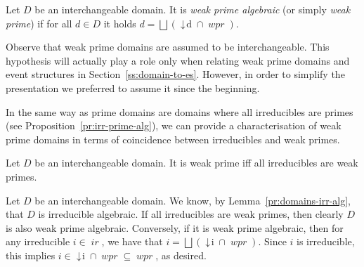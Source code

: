 \documentclass[conference]{IEEEtran}
\renewenvironment{proof}{\begin{IEEEproof}}{\end{IEEEproof}}
\newcommand{\wi}{{interchangeable}}
\newcommand{\compact}[1]{\ensuremath{\mathop{\mathsf{K}({#1})}}}
\newcommand{\principal}[1]{\ensuremath{\mathop{\downarrow\!{#1}}}}
\newcommand{\wpr}[1]{\ensuremath{\mathop{\mathit{wpr}({#1})}}}
\newcommand{\ir}[1]{\ensuremath{\mathop{\mathit{ir}({#1})}}}
\begin{document}
\begin{definition}
  \label{de:fusion-domain-new}
  Let $D$ be an {\wi} domain.  It is \emph{weak prime algebraic} (or simply
  \emph{weak prime}) if for all $d \in D$ it holds
  $d = \bigsqcup (\principal{d} \cap \wpr{D})$.
\end{definition}

Observe that weak prime domains are assumed to be interchangeable. This hypothesis will actually play a role only when relating weak prime domains and event structures in Section~\ref{ss:domain-to-es}. However, in order to simplify the presentation we preferred to assume it since the beginning.





In the same way as prime domains are domains where all
irreducibles are primes (see Proposition~\ref{pr:irr-prime-alg}), we
can provide a characterisation of weak prime domains in terms of
coincidence between irreducibles and weak primes.

\begin{proposition}
  \label{pr:fusion-domains}
  Let $D$ be an {\wi} domain.
  It is weak prime iff  all irreducibles are weak primes.
\end{proposition}


\begin{proof}
  Let $D$ be an {\wi} domain. We know, by
  Lemma~\ref{pr:domains-irr-alg}, that $D$ is irreducible
  algebraic. If all irreducibles are weak primes, then clearly $D$ is
  also weak prime algebraic. Conversely, if it is weak prime
  algebraic, then for any irreducible $i \in \ir{D}$, we have that
  $i = \bigsqcup (\principal{i} \cap \wpr{D})$. Since $i$ is
  irreducible, this implies
  $i \in \principal{i} \cap \wpr{D} \subseteq \wpr{D}$, as desired.
\end{proof}
\end{document}
